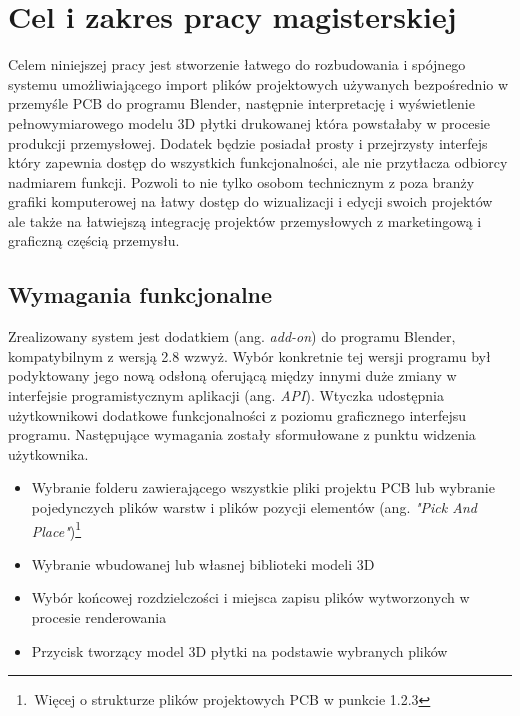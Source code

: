 \documentclass{xmgr}
\begin{document}

\chapter{Cel i zakres pracy magisterskiej}

Celem niniejszej pracy jest stworzenie łatwego do rozbudowania i spójnego systemu umożliwiającego import plików projektowych używanych bezpośrednio w przemyśle PCB do programu Blender, następnie interpretację i wyświetlenie pełnowymiarowego modelu 3D płytki drukowanej która powstałaby w procesie produkcji przemysłowej. Dodatek będzie posiadał prosty i przejrzysty interfejs który zapewnia dostęp do wszystkich funkcjonalności, ale nie przytłacza odbiorcy nadmiarem funkcji. Pozwoli to nie tylko osobom technicznym z poza branży grafiki komputerowej na łatwy dostęp do wizualizacji i edycji swoich projektów ale także na łatwiejszą integrację projektów przemysłowych z marketingową i graficzną częścią przemysłu.

\section{Wymagania funkcjonalne}

Zrealizowany system jest dodatkiem (ang. \emph{add-on}) do programu Blender, kompatybilnym z wersją 2.8 wzwyż. Wybór konkretnie tej wersji programu był podyktowany jego nową odsłoną oferującą między innymi duże zmiany w interfejsie programistycznym aplikacji (ang. \emph{API}). Wtyczka udostępnia użytkownikowi dodatkowe funkcjonalności z poziomu graficznego interfejsu programu. Następujące wymagania zostały sformułowane z punktu widzenia użytkownika.
\begin{itemize}
\item Wybranie folderu zawierającego wszystkie pliki projektu PCB lub wybranie pojedynczych plików warstw i  plików pozycji elementów (ang. \emph{"Pick And Place"})\footnote{\,Więcej o strukturze plików projektowych PCB w punkcie 1.2.3}
\item Wybranie wbudowanej lub własnej biblioteki modeli 3D
\item Wybór końcowej rozdzielczości i miejsca zapisu plików wytworzonych w procesie renderowania
\item Przycisk tworzący model 3D płytki na podstawie wybranych plików
\end{itemize}
\end{document}
